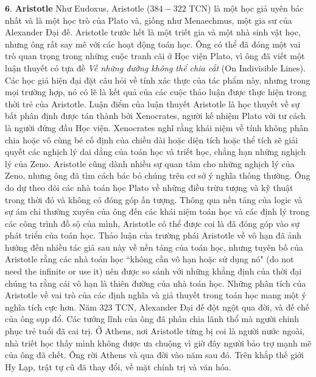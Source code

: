 \begin{multicols}{2}
	\vskip 0.1cm
	$\pmb{6.}$ \textbf{\color{lichsutoanhoc}Aristotle} 
	\vskip 0.1cm
	Như Eudoxus, Aristotle ($384-322$ TCN) là một học giả uyên bác nhất và là một học trò của Plato và, giống như Menaechmus, một gia sư của Alexander Đại đế. 
	\vskip 0.1cm
	Aristotle trước hết là một triết gia và một nhà sinh vật học, nhưng ông rất say mê với các hoạt động toán học. 
	\vskip 0.1cm
	Ông có thể đã đóng một vai trò quan trọng trong những cuộc tranh cãi ở Học viện Plato, vì ông đã viết một luận thuyết có tựa đề \textit{Về những đường không thể chia cắt} (On Indivisible Lines). Các học giả hiện đại đặt câu hỏi về tính xác thực của tác phẩm này, nhưng trong mọi trường hợp, nó có lẽ là kết quả của các cuộc thảo luận được thực hiện trong thời trẻ của Aristotle. 
	\vskip 0.1cm
	Luận điểm của luận thuyết Aristotle là học thuyết về sự bất phân định được tán thành bởi Xenocrates, người kế nhiệm Plato với tư cách là người đứng đầu Học viện.  
	\vskip 0.1cm
	Xenocrates nghĩ rằng khái niệm về tính không phân chia hoặc vô cùng bé cố định của chiều dài hoặc diện tích hoặc thể tích sẽ giải quyết các nghịch lý dai dẳng của toán học và triết học, chẳng hạn những nghịch lý của Zeno. 
	\vskip 0.1cm
	Aristotle cũng dành nhiều sự quan tâm cho những nghịch lý của Zeno, nhưng ông đã tìm cách bác bỏ chúng trên cơ sở ý nghĩa thông thường. Ông do dự theo dõi các nhà toán học Plato về những điều trừu tượng và kỹ thuật trong thời đó và không có đóng góp ấn tượng. 
	\vskip 0.1cm
	Thông qua nền tảng của logic và sự ám chỉ thường xuyên của ông đến các khái niệm toán học và các định lý trong các công trình đồ sộ của mình, Aristotle có thể được coi là đã đóng góp vào sự phát triển của toán học. 
	\vskip 0.1cm
	Thảo luận của trường phái Aristotle về vô hạn  đã ảnh hưởng đến nhiều tác giả sau này về nền tảng của toán học, nhưng tuyên bố của Aristotle rằng các nhà toán học ``không cần vô hạn hoặc sử dụng nó" (do not need the
	infinite or use it) nên được so sánh với những khẳng định của thời đại chúng ta rằng cái vô hạn là thiên đường của nhà toán học.  
	\vskip 0.1cm
	Những phân tích của Aristotle về vai trò của các định nghĩa và giả thuyết trong toán học mang một ý nghĩa tích cực hơn.
	\vskip 0.1cm
	Năm $323$ TCN, Alexander Đại đế đột ngột qua đời, và đế chế của ông sụp đổ. Các tướng lĩnh của ông đã phân chia lãnh thổ mà người chinh phục trẻ tuổi đã cai trị. Ở Athens, nơi Aristotle từng bị coi là người nước ngoài, nhà triết học thấy mình không được ưa chuộng vì giờ đây người bảo trợ mạnh mẽ của ông đã chết. Ông rời Athens và qua đời vào năm sau đó.
	\vskip 0.1cm
	Trên khắp thế giới Hy Lạp, trật tự cũ đã thay đổi, về mặt chính trị và văn hóa. 

\end{multicols}
